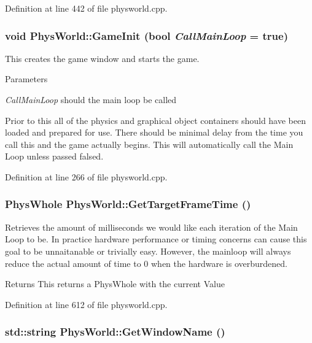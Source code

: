 Definition at line 442 of file physworld.cpp.\hypertarget{classPhysWorld_afc5116f97cc1e91e899d1a1ca7e14e9b}{
\subsubsection[{GameInit}]{\setlength{\rightskip}{0pt plus 5cm}void PhysWorld::GameInit (bool {\em CallMainLoop} = {\ttfamily true})}}
\label{db/df5/classPhysWorld_afc5116f97cc1e91e899d1a1ca7e14e9b}


This creates the game window and starts the game. 
\begin{DoxyParams}{Parameters}
\item[{\em CallMainLoop}]should the main loop be called\end{DoxyParams}
Prior to this all of the physics and graphical object containers should have been loaded and prepared for use. There should be minimal delay from the time you call this and the game actually begins. This will automatically call the Main Loop unless passed falsed. 

Definition at line 266 of file physworld.cpp.\hypertarget{classPhysWorld_a33e8430ed43897276ca55fbb47e54bcf}{
\subsubsection[{GetTargetFrameTime}]{\setlength{\rightskip}{0pt plus 5cm}PhysWhole PhysWorld::GetTargetFrameTime ()}}
\label{db/df5/classPhysWorld_a33e8430ed43897276ca55fbb47e54bcf}


Retrieves the amount of milliseconds we would like each iteration of the Main Loop to be. In practice hardware performance or timing concerns can cause this goal to be unnaitanable or trivially easy. However, the mainloop will always reduce the actual amount of time to 0 when the hardware is overburdened. \begin{DoxyReturn}{Returns}
This returns a PhysWhole with the current Value 
\end{DoxyReturn}


Definition at line 612 of file physworld.cpp.\hypertarget{classPhysWorld_a09163480a549b39a945ee97415eabdc0}{
\subsubsection[{GetWindowName}]{\setlength{\rightskip}{0pt plus 5cm}std::string PhysWorld::GetWindowName ()}}
\label{db/df5/classPhysWorld_a09163480a549b39a945ee97415eabdc0}


